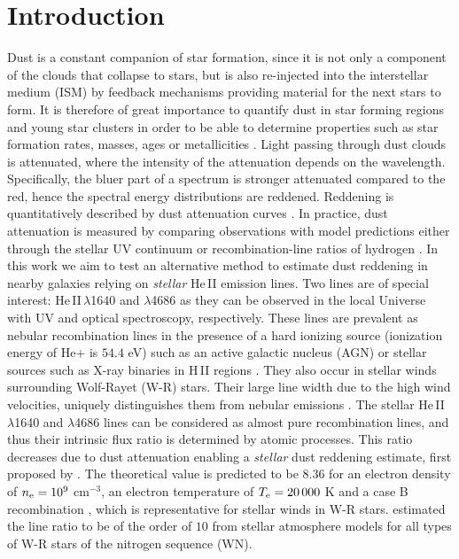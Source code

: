 \documentclass[]{aastex63}
\begin{document}
\section{Introduction}\label{sec:intro}
Dust is a constant companion of star formation, since it is not only a component of the clouds that collapse to stars, but is also re-injected into the interstellar medium (ISM) by feedback mechanisms providing material for the next stars to form. It is therefore of great importance to quantify dust in star forming regions and young star clusters in order to be able to determine properties such as star formation rates, masses, ages or metallicities \citep{calzetti_dust_2009}.
Light passing through dust clouds is attenuated, where the intensity of the attenuation depends on the wavelength. Specifically, the bluer part of a spectrum is stronger attenuated compared to the red, hence the spectral energy distributions are reddened. Reddening is quantitatively described by dust attenuation curves \citep[][]{fitzpatrick_average_1986, calzetti_dust_1994, salim_dust_2018}. 
In practice, dust attenuation is measured by comparing observations with model predictions either through the stellar UV continuum \citep[e.g.][]{calzetti_dust_1994} or recombination-line ratios of hydrogen \citep[e.g.][]{dominguez_dust_2013}. 
In this work we aim to test an alternative method to estimate dust reddening in nearby galaxies relying on \textit{stellar} He\,II emission lines.
Two lines are of special interest: He\,II\,$\lambda$1640 and $\lambda$4686 as they can be observed in the local Universe with UV and optical spectroscopy, respectively. These lines are prevalent as nebular recombination lines in the presence of a hard ionizing source (ionization energy of He+ is $54.4$ eV) such as an active galactic nucleus (AGN) or stellar sources such as X-ray binaries in H\,II regions \citep{shirazi_strongly_2012}. They also occur in stellar winds surrounding Wolf-Rayet (W-R) stars. Their large line width due to the high wind velocities, uniquely distinguishes them from nebular emissions \citep{schaerer_about_1996}. 
The stellar He\,II\,$\lambda$1640 and $\lambda$4686 lines can be considered as almost pure recombination lines, and thus their intrinsic flux ratio is determined by atomic processes. This ratio decreases due to dust attenuation enabling a {\it stellar} dust reddening estimate, first proposed by \citet{conti_new_1990}. The theoretical value is predicted to be $8.36$ for an electron density of $n\rm _e = 10^9$ cm$^{-3}$, an electron temperature of $T\rm_e=20\,000$ K and a case B recombination \citep{hummer_recombination-line_1987}, which is representative for stellar winds in W-R stars. \citet{crowther_reduced_2006} estimated the line ratio to be of the order of $10$ from stellar atmosphere models for all types of W-R stars of the nitrogen sequence (WN).
\end{document}
